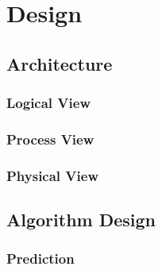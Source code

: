 \label{design}
\chapter{Design}
\minitoc 

\clearpage

\section{Architecture}

\subsection{Logical View}

\subsection{Process View}

\subsection{Physical View}

\section{Algorithm Design}

\subsection{Prediction}\label{algorithm-design:prediction}
